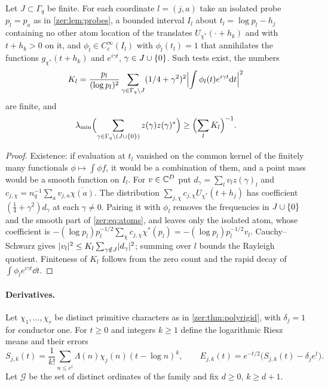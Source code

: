 \begin{proposition}\label{zer:prop:atoms}
Let $J\subset\Gamma_q$ be finite. For each coordinate $l=(j,a)$ take an isolated probe
$p_l=p_a$ as in \cref{zer:lem:probes}, a bounded interval $I_l$ about
$t_l=\log p_l-h_j$ containing no other atom location of the translates
$U_{\chi^*}(\cdot+h_k)$ and with $t+h_k>0$ on it, and $\phi_l\in C_c^\infty(I_l)$ with
$\phi_l(t_l)=1$ that annihilates the functions $g_{\chi^*}(t+h_k)$ and $e^{i\gamma t}$,
$\gamma\in J\cup\{0\}$. Such tests exist, the numbers
\[
 K_l=\frac{p_l}{(\log p_l)^2}\sum_{\gamma\in\Gamma_q\setminus J}(1/4+\gamma^2)^2
 \Bigl|\int\phi_l(t)e^{i\gamma t}\mathrm{d} t\Bigr|^2
\]
are finite, and
\[
 \lambda_{\min}\Bigl(\sum_{\gamma\in\Gamma_q\setminus(J\cup\{0\})}z(\gamma)z(\gamma)^*\Bigr)\ge\Bigl(\sum_lK_l\Bigr)^{-1}.
\]
\end{proposition}
\begin{proof}
Existence: if evaluation at $t_l$ vanished on the common kernel of the finitely many
functionals $\phi\mapsto\int\phi f$, it would be a combination of them, and a point mass would be
a smooth function on $I_l$. For $v\in\mathbb{C}^D$ put $d_\gamma=\sum_lv_lz(\gamma)_l$ and
$c_{j,\chi}=n_q^{-1}\sum_av_{j,a}\overline{\chi(a)}$. The distribution
$\sum_{j,\chi}c_{j,\chi}U_{\chi^*}(t+h_j)$ has coefficient $(\tfrac14+\gamma^2)d_\gamma$ at each
$\gamma\ne0$. Pairing it with $\phi_l$ removes the frequencies in $J\cup\{0\}$ and the smooth part
of \eqref{zer:eq:atoms}, and leaves only the isolated atom, whose coefficient is
$-(\log p_l)p_l^{-1/2}\sum_\chi c_{j,\chi}\chi^*(p_l)=-(\log p_l)p_l^{-1/2}v_l$. Cauchy--Schwarz gives
$\lvert v_l\rvert^2\le K_l\sum_{\gamma\notin J}\lvert d_\gamma\rvert^2$; summing over $l$ bounds the Rayleigh
quotient. Finiteness of $K_l$ follows from the zero count and the rapid decay of
$\int\phi_le^{i\gamma t}\dd t$.
\end{proof}

\paragraph{Derivatives.}
Let $\chi_1,\dots,\chi_r$ be distinct primitive characters as in \cref{zer:thm:polyrigid}, with
$\delta_j=1$ for conductor one. For $t\ge0$ and integers $k\ge1$ define the logarithmic Riesz
means and their errors
\[
 S_{j,k}(t)=\frac1{k!}\sum_{n\le e^t}\Lambda(n)\chi_j(n)(t-\log n)^k,\qquad
 E_{j,k}(t)=e^{-t/2}\bigl(S_{j,k}(t)-\delta_je^t\bigr).
\]
Let $\mathcal G$ be the set of distinct ordinates of the family and fix $d\ge0$, $k\ge d+1$.

